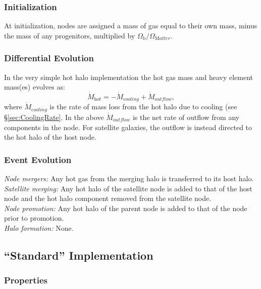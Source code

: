 \subsubsection{Initialization}

At initialization, nodes are assigned a mass of gas equal to their own mass, minus the mass of any progenitors, multiplied by $\Omega_{\mathrm b}/\Omega_{\mathrm Matter}$.

\subsubsection{Differential Evolution}

In the very simple hot halo implementation the hot gas mass and heavy element mass(es) evolves as:
\begin{equation}
 \dot{M}_{\mathrm hot} = - \dot{M}_{\mathrm cooling} + \dot{M}_{\mathrm outflow},
\end{equation}
where $\dot{M}_{\mathrm cooling}$ is the rate of mass loss from the hot halo due to cooling (see \S\ref{sec:CoolingRate}.
In the above $\dot{M}_{\mathrm outflow}$ is the net rate of outflow from any components in the node. For satellite galaxies, the outflow is instead directed to the hot halo of the host \gls{node}.

\subsubsection{Event Evolution}

\noindent\emph{Node mergers:} Any hot gas from the merging halo is transferred to its host halo.\\

\noindent\emph{Satellite merging:} Any hot halo of the satellite \gls{node} is added to that of the host \gls{node} and the hot halo \gls{component} removed from the satellite node.\\

\noindent\emph{Node promotion:} Any hot halo of the parent \gls{node} is added to that of the \gls{node} prior to promotion.\\

\noindent\emph{Halo formation:} None.\\

\subsection{``Standard'' Implementation}

\subsubsection{Properties}

